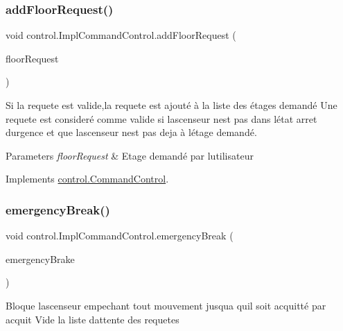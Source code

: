 \subsubsection{\texorpdfstring{addFloorRequest()}{addFloorRequest()}}
{\footnotesize\ttfamily void control.\+Impl\+Command\+Control.\+add\+Floor\+Request (\begin{DoxyParamCaption}\item[{\mbox{\hyperlink{classcontrol_1_1command_1_1_floor_request}{Floor\+Request}}}]{floor\+Request }\end{DoxyParamCaption})}

Si la requete est valide,la requete est ajouté à la liste des étages demandé Une requete est consideré comme valide si l\textquotesingle{}ascenseur n\textquotesingle{}est pas dans l\textquotesingle{}état arret d\textquotesingle{}urgence et que l\textquotesingle{}ascenseur n\textquotesingle{}est pas deja à l\textquotesingle{}étage demandé. 
\begin{DoxyParams}{Parameters}
{\em floor\+Request} & Etage demandé par l\textquotesingle{}utilisateur \\
\hline
\end{DoxyParams}


Implements \mbox{\hyperlink{interfacecontrol_1_1_command_control_addb1fea724cbd015456ac62a1dcf556d}{control.\+Command\+Control}}.

\mbox{\label{classcontrol_1_1_impl_command_control_a1a3e2202d967016c70f6c7e2105fc4c7}} 
\subsubsection{\texorpdfstring{emergencyBreak()}{emergencyBreak()}}
{\footnotesize\ttfamily void control.\+Impl\+Command\+Control.\+emergency\+Break (\begin{DoxyParamCaption}\item[{\mbox{\hyperlink{classcontrol_1_1command_1_1_emergency_brake}{Emergency\+Brake}}}]{emergency\+Brake }\end{DoxyParamCaption})}

Bloque l\textquotesingle{}ascenseur empechant tout mouvement jusqu\textquotesingle{}a qu\textquotesingle{}il soit acquitté par acquit Vide la liste d\textquotesingle{}attente des requetes 

